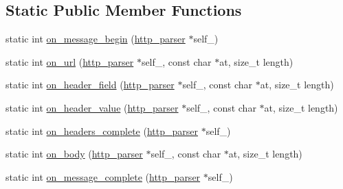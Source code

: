 \subsection*{Static Public Member Functions}
\begin{DoxyCompactItemize}
\item 
static int \hyperlink{structcrow_1_1_h_t_t_p_parser_a44a23f77710b845a920384d8c186be4e}{on\-\_\-message\-\_\-begin} (\hyperlink{structhttp__parser}{http\-\_\-parser} $\ast$self\-\_\-)
\item 
static int \hyperlink{structcrow_1_1_h_t_t_p_parser_a1045990cfa9a0be0a0e6cf3cdf533636}{on\-\_\-url} (\hyperlink{structhttp__parser}{http\-\_\-parser} $\ast$self\-\_\-, const char $\ast$at, size\-\_\-t length)
\item 
static int \hyperlink{structcrow_1_1_h_t_t_p_parser_a1b0ee8db3529fb27e5a29fb89749128d}{on\-\_\-header\-\_\-field} (\hyperlink{structhttp__parser}{http\-\_\-parser} $\ast$self\-\_\-, const char $\ast$at, size\-\_\-t length)
\item 
static int \hyperlink{structcrow_1_1_h_t_t_p_parser_aa19462e925e68cf5525eba239491ae77}{on\-\_\-header\-\_\-value} (\hyperlink{structhttp__parser}{http\-\_\-parser} $\ast$self\-\_\-, const char $\ast$at, size\-\_\-t length)
\item 
static int \hyperlink{structcrow_1_1_h_t_t_p_parser_a33dc43c79b00bc6dad4c317a42ee09a2}{on\-\_\-headers\-\_\-complete} (\hyperlink{structhttp__parser}{http\-\_\-parser} $\ast$self\-\_\-)
\item 
static int \hyperlink{structcrow_1_1_h_t_t_p_parser_ae02056c2811a0008bb4e3851a48791c3}{on\-\_\-body} (\hyperlink{structhttp__parser}{http\-\_\-parser} $\ast$self\-\_\-, const char $\ast$at, size\-\_\-t length)
\item 
static int \hyperlink{structcrow_1_1_h_t_t_p_parser_a614c34dd524540e4853496c386a0100c}{on\-\_\-message\-\_\-complete} (\hyperlink{structhttp__parser}{http\-\_\-parser} $\ast$self\-\_\-)
\end{DoxyCompactItemize}

